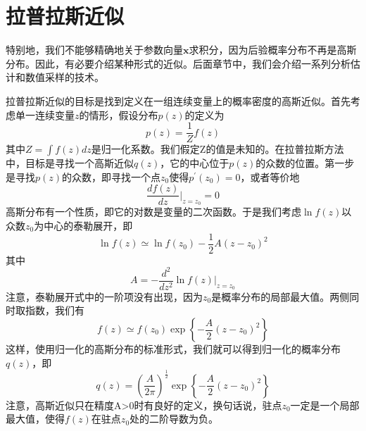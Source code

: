 \section{拉普拉斯近似}
特别地，我们不能够精确地关于参数向量$\boldsymbol{x}$求积分，因为后验概率分布不再是高斯分布。因此，有必要介绍某种形式的近似。后面章节中，我们会介绍一系列分析估计和数值采样的技术。

拉普拉斯近似的目标是找到定义在一组连续变量上的概率密度的高斯近似。首先考虑单一连续变量$z$的情形，假设分布$p(z)$的定义为
\begin{equation}
	p(z)=\frac{1}{Z}f(z)
\end{equation}
其中$Z=\int f(z)dz$是归一化系数。我们假定Z的值是未知的。在拉普拉斯方法中，目标是寻找一个高斯近似$q(z)$，它的中心位于$p(z)$的众数的位置。第一步是寻找$p(z)$的众数，即寻找一个点$z_0$使得$p^{'}(z_0)=0$，或者等价地
\begin{equation}
	\frac{df(z)}{dz}\Bigg|_{z=z_0}=0
\end{equation}
高斯分布有一个性质，即它的对数是变量的二次函数。于是我们考虑$\ln f(z)$以众数$z_0$为中心的泰勒展开，即
\begin{equation}
	\ln f(z)\simeq \ln f(z_0) -\frac{1}{2}A(z-z_0)^2
\end{equation}
其中
\begin{equation}
	A=-\frac{d^2}{dz^2}\ln f(z)\Bigg|_{z=z_0}
\end{equation}
注意，泰勒展开式中的一阶项没有出现，因为$z_0$是概率分布的局部最大值。两侧同时取指数，我们有
\begin{equation}
	f(z)\simeq f(z_0)\exp\left\{-\frac{A}{2}(z-z_0)^2 \right\}
\end{equation}
这样，使用归一化的高斯分布的标准形式，我们就可以得到归一化的概率分布$q(z)$，即
\begin{equation}
	q(z)=\left(\frac{A}{2\pi} \right)^{\frac{1}{2}}\exp\left\{-\frac{A}{2}(z-z_0)^2 \right\}
\end{equation}
注意，高斯近似只在精度A>0时有良好的定义，换句话说，驻点$z_0$一定是一个局部最大值，使得$f(z)$在驻点$z_0$处的二阶导数为负。


